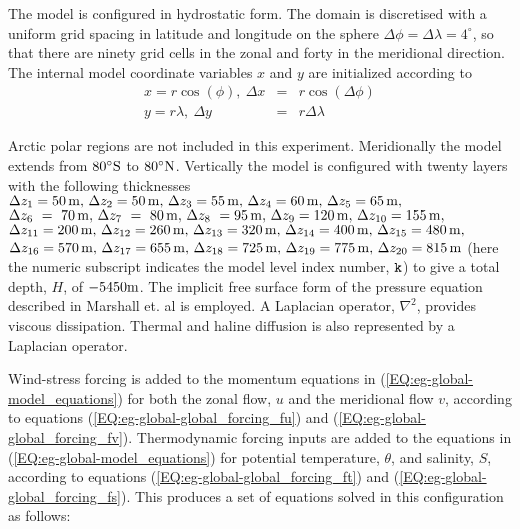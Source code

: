  The model is configured in hydrostatic form.  The domain is discretised with 
a uniform grid spacing in latitude and longitude on the sphere
 $\Delta \phi=\Delta \lambda=4^{\circ}$, so 
that there are ninety grid cells in the zonal and forty in the 
meridional direction. The internal model coordinate variables
$x$ and $y$ are initialized according to
\begin{eqnarray}
x=r\cos(\phi),~\Delta x & = &r\cos(\Delta \phi) \\
y=r\lambda,~\Delta y &= &r\Delta \lambda 
\end{eqnarray}

Arctic polar regions are not
included in this experiment. Meridionally the model extends from
$80^{\circ}{\rm S}$ to $80^{\circ}{\rm N}$.
Vertically the model is configured with twenty layers with the 
following thicknesses
$\Delta z_{1} = 50\,{\rm m},\,
 \Delta z_{2} = 50\,{\rm m},\,
 \Delta z_{3} = 55\,{\rm m},\,
 \Delta z_{4} = 60\,{\rm m},\,
 \Delta z_{5} = 65\,{\rm m},\,
$
$
 \Delta z_{6}~=~70\,{\rm m},\,
 \Delta z_{7}~=~80\,{\rm m},\,
 \Delta z_{8}~=95\,{\rm m},\,
 \Delta z_{9}=120\,{\rm m},\,
 \Delta z_{10}=155\,{\rm m},\,
$
$
 \Delta z_{11}=200\,{\rm m},\,
 \Delta z_{12}=260\,{\rm m},\,
 \Delta z_{13}=320\,{\rm m},\,
 \Delta z_{14}=400\,{\rm m},\,
 \Delta z_{15}=480\,{\rm m},\,
$
$
 \Delta z_{16}=570\,{\rm m},\,
 \Delta z_{17}=655\,{\rm m},\,
 \Delta z_{18}=725\,{\rm m},\,
 \Delta z_{19}=775\,{\rm m},\,
 \Delta z_{20}=815\,{\rm m}
$ (here the numeric subscript indicates the model level index number, ${\tt k}$) to
give a total depth, $H$, of $-5450{\rm m}$.
The implicit free surface form of the pressure equation described in Marshall et. al 
\cite{marshall:97a} is employed. A Laplacian operator, $\nabla^2$, provides viscous
dissipation. Thermal and haline diffusion is also represented by a Laplacian operator.

Wind-stress forcing is added to the momentum equations in (\ref{EQ:eg-global-model_equations}) 
for both the zonal flow, $u$ and the meridional flow $v$, according to equations 
(\ref{EQ:eg-global-global_forcing_fu}) and (\ref{EQ:eg-global-global_forcing_fv}).
Thermodynamic forcing inputs are added to the equations 
in (\ref{EQ:eg-global-model_equations}) for
potential temperature, $\theta$, and salinity, $S$, according to equations 
(\ref{EQ:eg-global-global_forcing_ft}) and (\ref{EQ:eg-global-global_forcing_fs}).
This produces a set of equations solved in this configuration as follows:

